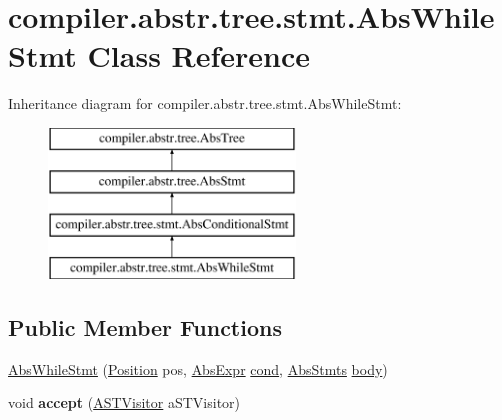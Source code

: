 \hypertarget{classcompiler_1_1abstr_1_1tree_1_1stmt_1_1_abs_while_stmt}{}\section{compiler.\+abstr.\+tree.\+stmt.\+Abs\+While\+Stmt Class Reference}
\label{classcompiler_1_1abstr_1_1tree_1_1stmt_1_1_abs_while_stmt}
Inheritance diagram for compiler.\+abstr.\+tree.\+stmt.\+Abs\+While\+Stmt\+:\begin{figure}[H]
\begin{center}
\leavevmode
\includegraphics[height=4.000000cm]{classcompiler_1_1abstr_1_1tree_1_1stmt_1_1_abs_while_stmt}
\end{center}
\end{figure}
\subsection*{Public Member Functions}
\begin{DoxyCompactItemize}
\item 
\hyperlink{classcompiler_1_1abstr_1_1tree_1_1stmt_1_1_abs_while_stmt_a321c0595d77243ea8a91e6676f19da5f}{Abs\+While\+Stmt} (\hyperlink{classcompiler_1_1_position}{Position} pos, \hyperlink{classcompiler_1_1abstr_1_1tree_1_1expr_1_1_abs_expr}{Abs\+Expr} \hyperlink{classcompiler_1_1abstr_1_1tree_1_1stmt_1_1_abs_while_stmt_a1a49a7895323e9416d54518e5ad81f02}{cond}, \hyperlink{classcompiler_1_1abstr_1_1tree_1_1_abs_stmts}{Abs\+Stmts} \hyperlink{classcompiler_1_1abstr_1_1tree_1_1stmt_1_1_abs_while_stmt_ad8d10bacbdb4e81afd46cd3861cab123}{body})
\item 
\mbox{\label{classcompiler_1_1abstr_1_1tree_1_1stmt_1_1_abs_while_stmt_a9c2a581278c46ebbf92225ae637f5335}} 
void {\bfseries accept} (\hyperlink{interfacecompiler_1_1abstr_1_1_a_s_t_visitor}{A\+S\+T\+Visitor} a\+S\+T\+Visitor)
\end{DoxyCompactItemize}
